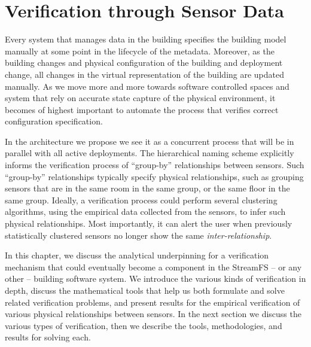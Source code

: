 \section{Verification through Sensor Data}


Every system that manages data in the building specifies the building model manually at some point in the lifecycle of
the metadata.  Moreover, as the building changes and physical configuration of the building and deployment change,
all changes in the virtual representation of the building are updated manually.  As we move more and more towards
software controlled spaces and system that rely on accurate state capture of the physical environment, it becomes 
of highest important to automate the process that verifies correct configuration specification.

In the architecture we propose we see it as a concurrent process that will be in parallel with all active deployments.
The hierarchical naming scheme explicitly informs the verification process of ``group-by'' relationships between sensors.
Such ``group-by'' relationships typically specify physical relationships, such as grouping sensors that are in the same 
room in the same group, or the same floor in the same group.  Ideally, a verification process could perform several clustering
algorithms, using the empirical data collected from the sensors, to infer such physical relationships.  Most importantly,
it can alert the user when previously statistically clustered sensors no longer show the same \emph{inter-relationship}.

In this chapter, we discuss the analytical underpinning for a verification mechanism that could eventually become a 
component in the StreamFS -- or any other -- building software system.  We introduce the various kinds of verification in depth,
discuss the mathematical tools that help us both formulate and solve related verification problems, and present
results for the empirical verification of various physical relationships between sensors.  In the next section we discuss the various
types of verification, then we describe the tools, methodologies, and results for solving each.



